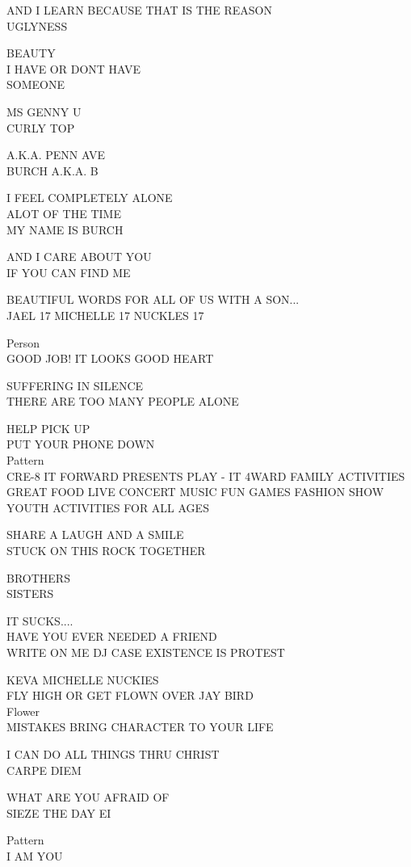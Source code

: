 \documentclass[10pt,letterpaper]{article}
\begin{document}
AND I LEARN BECAUSE THAT IS THE REASON\\
UGLYNESS

BEAUTY\\
I HAVE OR DONT HAVE\\
SOMEONE

MS GENNY U\\
CURLY TOP

A.K.A. PENN AVE\\
BURCH A.K.A. B

I FEEL COMPLETELY ALONE\\
ALOT OF THE TIME\\
MY NAME IS BURCH

AND I CARE ABOUT YOU\\
IF YOU CAN FIND ME

BEAUTIFUL WORDS FOR ALL OF US WITH A SON...\\
JAEL 17 MICHELLE 17 NUCKLES 17

Person\\
GOOD JOB!  IT LOOKS GOOD HEART

SUFFERING IN SILENCE\\
THERE ARE TOO MANY PEOPLE ALONE

HELP PICK UP\\
PUT YOUR PHONE DOWN\\
Pattern\\
CRE{-}8 IT FORWARD PRESENTS PLAY {-} IT 4WARD FAMILY ACTIVITIES GREAT FOOD LIVE CONCERT MUSIC FUN GAMES FASHION SHOW YOUTH ACTIVITIES FOR ALL AGES

SHARE A LAUGH AND A SMILE\\
STUCK ON THIS ROCK TOGETHER

BROTHERS\\
SISTERS

IT SUCKS....\\
HAVE YOU EVER NEEDED A FRIEND\\
WRITE ON ME DJ CASE EXISTENCE IS PROTEST

KEVA MICHELLE NUCKIES\\
FLY HIGH OR GET FLOWN OVER JAY BIRD\\
Flower\\
MISTAKES BRING CHARACTER TO YOUR LIFE

I CAN DO ALL THINGS THRU CHRIST\\
CARPE DIEM

WHAT ARE YOU AFRAID OF\\
SIEZE THE DAY EI

Pattern\\
I AM YOU
\end{document}
